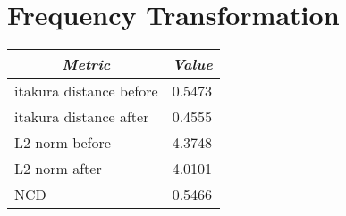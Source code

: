\section{Frequency Transformation} %
\label{sec:frequency_transformation}

\begin{table}[ht]
	\begin{center}
		\begin{tabular}{ll}
			\toprule
			\multicolumn{1}{c}{\emph{Metric}} & \multicolumn{1}{c}{\emph{Value}} \\
			\midrule
			itakura distance before & 0.5473 \\
			itakura distance after & 0.4555 \\
			L2 norm before & 4.3748\\
			L2 norm after & 4.0101 \\
			NCD & 0.5466 \\
			\bottomrule			
		\end{tabular}		
	\end{center}
\label{tab:frequency_transform_for_unvoiced_frames}	
\end{table}


